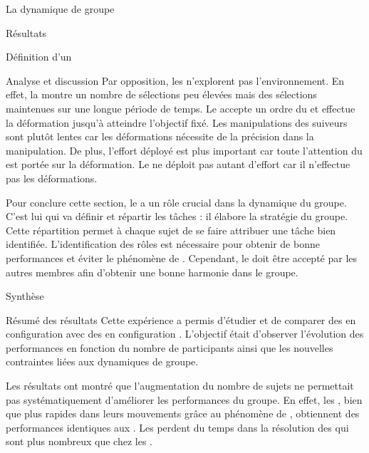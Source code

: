 \documentclass[myfrancais]{mythesis}
\begin{document}
\begin{mychapter}{La dynamique de groupe}
\begin{mysection}{Résultats}
\begin{mysubsection}{Définition d'un }
\begin{mysubsubsection}{Analyse et discussion}
					Par opposition, les  n'explorent pas l'environnement.
					En effet, la  montre un nombre de sélections peu élevées mais des sélections maintenues sur une longue période de temps.
					Le  accepte un ordre du  et effectue la déformation jusqu'à atteindre l'objectif fixé.
					Les manipulations des suiveurs sont plutôt lentes car les déformations nécessite de la précision dans la manipulation.
					De plus, l'effort déployé est plus important car toute l'attention du  est portée sur la déformation.
					Le  ne déploit pas autant d'effort car il n'effectue pas les déformations.

					Pour conclure cette section, le  a un rôle crucial dans la dynamique du groupe.
					C'est lui qui va définir et répartir les tâches : il élabore la stratégie du groupe.
					Cette répartition permet à chaque sujet de se faire attribuer une tâche bien identifiée.
					L'identification des rôles est nécessaire pour obtenir de bonne performances et éviter le phénomène de  .
					Cependant, le  doit être accepté par les autres membres afin d'obtenir une bonne harmonie dans le groupe.
				\end{mysubsubsection}
			\end{mysubsection}
		\end{mysection}
		\begin{mysection}{Synthèse}
			\begin{mysubsection}{Résumé des résultats}
				Cette expérience a permis d'étudier et de comparer des  en configuration  avec des  en configuration .
				L'objectif était d'observer l'évolution des performances en fonction du nombre de participants ainsi que les nouvelles contraintes liées aux dynamiques de groupe.

				Les résultats ont montré que l'augmentation du nombre de sujets ne permettait pas systématiquement d'améliorer les performances du groupe.
				En effet, les , bien que plus rapides dans leurs mouvements grâce au phénomène de , obtiennent des performances identiques aux .
				Les  perdent du temps dans la résolution des  qui sont plus nombreux que chez les .


\end{mysubsection}
\end{mysection}
\end{mychapter}
\end{document}
